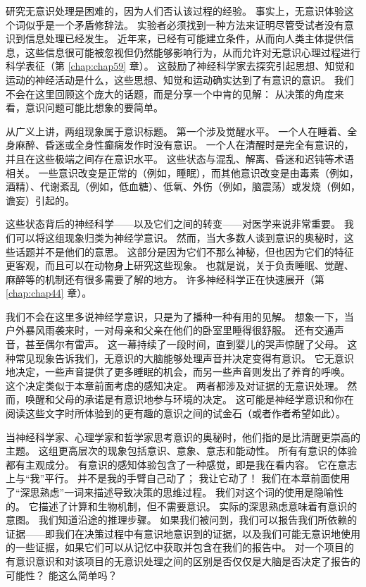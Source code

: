 研究无意识处理是困难的，因为人们否认该过程的经验。
事实上，无意识体验这个词似乎是一个矛盾修辞法。
实验者必须找到一种方法来证明尽管受试者没有意识到信息处理已经发生。
近年来，已经有可能建立条件，从而向人类主体提供信息，这些信息很可能被忽视但仍然能够影响行为，从而允许对无意识心理过程进行科学表征（第 \ref{chap:chap59} 章）。
这鼓励了神经科学家去探究引起思想、知觉和运动的神经活动是什么，这些思想、知觉和运动确实达到了有意识的意识。
我们不会在这里回顾这个庞大的话题，而是分享一个中肯的见解：
从决策的角度来看，意识问题可能比想象的要简单。


从广义上讲，两组现象属于意识标题。
第一个涉及觉醒水平。
一个人在睡着、全身麻醉、昏迷或全身性癫痫发作时没有意识。
一个人在清醒时是完全有意识的，并且在这些极端之间存在意识水平。
这些状态与混乱、解离、昏迷和迟钝等术语相关。
一些意识改变是正常的（例如，睡眠），而其他意识改变是由毒素（例如，酒精）、代谢紊乱（例如，低血糖）、低氧、外伤（例如，脑震荡）或发烧（例如，谵妄）引起的。


这些状态背后的神经科学——以及它们之间的转变——对医学来说非常重要。
我们可以将这组现象归类为神经学意识。
然而，当大多数人谈到意识的奥秘时，这些话题并不是他们的意思。
这部分是因为它们不那么神秘，但也因为它们的特征更客观，而且可以在动物身上研究这些现象。
也就是说，关于负责睡眠、觉醒、麻醉等的机制还有很多需要了解的地方。
许多神经科学正在快速展开（第 \ref{chap:chap44} 章）。


我们不会在这里多说神经学意识，只是为了播种一种有用的见解。
想象一下，当户外暴风雨袭来时，一对母亲和父亲在他们的卧室里睡得很舒服。
还有交通声音，甚至偶尔有雷声。
这一幕持续了一段时间，直到婴儿的哭声惊醒了父母。
这种常见现象告诉我们，无意识的大脑能够处理声音并决定变得有意识。
它无意识地决定，一些声音提供了更多睡眠的机会，而另一些声音则发出了养育的呼唤。
这个决定类似于本章前面考虑的感知决定。 两者都涉及对证据的无意识处理。
然而，唤醒和父母的承诺是有意识地参与环境的决定。
这可能是神经学意识和你在阅读这些文字时所体验到的更有趣的意识之间的试金石（或者作者希望如此）。


当神经科学家、心理学家和哲学家思考意识的奥秘时，他们指的是比清醒更崇高的主题。
这组更高层次的现象包括意识、意象、意志和能动性。
所有有意识的体验都有主观成分。
有意识的感知体验包含了一种感觉，即是我在看内容。
它在意志上与“我”平行。
并不是我的手臂自己动了；
我让它动了！
我们在本章前面使用了“深思熟虑”一词来描述导致决策的思维过程。
我们对这个词的使用是隐喻性的。
它描述了计算和生物机制，但不需要意识。
实际的深思熟虑意味着有意识的意图。
我们知道沿途的推理步骤。
如果我们被问到，我们可以报告我们所依赖的证据——即我们在决策过程中有意识地意识到的证据，以及我们可能无意识地使用的一些证据，如果它们可以从记忆中获取并包含在我们的报告中。
对一个项目的有意识意识和对该项目的无意识处理之间的区别是否仅仅是大脑是否决定了报告的可能性？
能这么简单吗？


